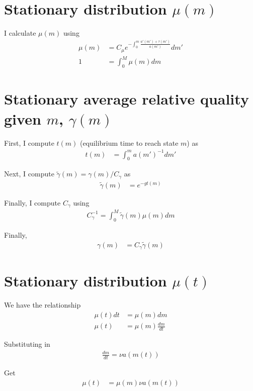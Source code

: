 \documentclass[12pt,english]{article}
\theoremstyle{remark}
\begin{document}
\section{Stationary distribution $\mu(m)$}

I calculate $\mu(m)$ using 
\begin{align*}
	\mu(m) &= C_{\mu} e^{-\int_0^m \frac{a'(m') + \tau(m')}{a(m')}}dm' \\
	1 &= \int_0^{M} \mu(m)dm
\end{align*}

\section{Stationary average relative quality given $m$, $\gamma(m)$}

First, I compute $t(m)$ (equilibrium time to reach state $m$) as 
\begin{align*}
t(m) &= \int_0^m a(m')^{-1} dm' 
\end{align*}

Next, I compute $\tilde{\gamma}(m) = \gamma(m) / C_{\gamma}$ as 
\begin{align*}
	\tilde{\gamma}(m) &= e^{-gt(m)}
\end{align*}

Finally, I compute $C_{\gamma}$ using 
\begin{align*}
	C_{\gamma}^{-1} = \int_0^{M} \tilde{\gamma}(m) \mu(m) dm
\end{align*}

Finally, 
\begin{align*}
	\gamma(m) &= C_{\gamma} \tilde{\gamma}(m) 
\end{align*}

\section{Stationary distribution $\mu(t)$}

We have the relationship
\begin{align*}
\mu(t)dt &= \mu(m)dm \\
\mu(t) &= \mu(m) \frac{dm}{dt}
\end{align*}

Substituting in
\begin{align*}
\frac{dm}{dt} = \nu a(m(t))
\end{align*}

Get 
\begin{align*}
\mu(t) &= \mu(m) \nu a(m(t))
\end{align*}
\end{document}
